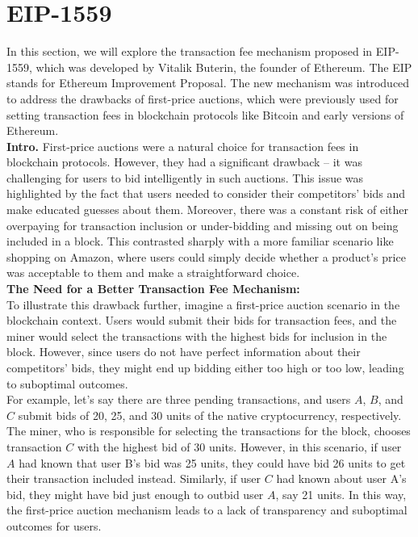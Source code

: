 \section{EIP-1559}
In this section, we will explore the transaction fee mechanism proposed in EIP-1559, which was developed by Vitalik Buterin, the founder of Ethereum. The EIP stands for Ethereum Improvement Proposal. The new mechanism was introduced to address the drawbacks of first-price auctions, which were previously used for setting transaction fees in blockchain protocols like Bitcoin and early versions of Ethereum.\\

\noindent
\textbf{Intro.} First-price auctions were a natural choice for transaction fees in blockchain protocols. However, they had a significant drawback – it was challenging for users to bid intelligently in such auctions. This issue was highlighted by the fact that users needed to consider their competitors' bids and make educated guesses about them. Moreover, there was a constant risk of either overpaying for transaction inclusion or under-bidding and missing out on being included in a block. This contrasted sharply with a more familiar scenario like shopping on Amazon, where users could simply decide whether a product's price was acceptable to them and make a straightforward choice.\\

\noindent
\textbf{The Need for a Better Transaction Fee Mechanism:}\\
To illustrate this drawback further, imagine a first-price auction scenario in the blockchain context. Users would submit their bids for transaction fees, and the miner would select the transactions with the highest bids for inclusion in the block. However, since users do not have perfect information about their competitors' bids, they might end up bidding either too high or too low, leading to suboptimal outcomes.\\

For example, let's say there are three pending transactions, and users $A$, $B$, and $C$ submit bids of 20, 25, and 30 units of the native cryptocurrency, respectively. The miner, who is responsible for selecting the transactions for the block, chooses transaction $C$ with the highest bid of 30 units. However, in this scenario, if user $A$ had known that user B's bid was 25 units, they could have bid 26 units to get their transaction included instead. Similarly, if user $C$ had known about user A's bid, they might have bid just enough to outbid user $A$, say 21 units. In this way, the first-price auction mechanism leads to a lack of transparency and suboptimal outcomes for users.\\

